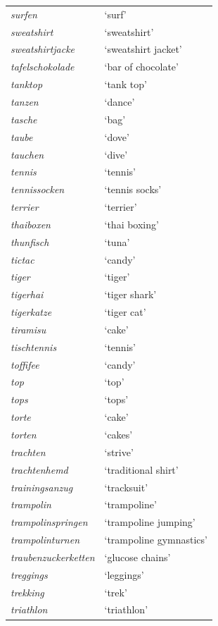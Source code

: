 \begin{longtable}{ll}
\textit{surfen} & `surf' \\
\textit{sweatshirt} & `sweatshirt' \\
\textit{sweatshirtjacke} & `sweatshirt jacket' \\
\textit{tafelschokolade} & `bar of chocolate' \\
\textit{tanktop} & `tank top' \\
\textit{tanzen} & `dance' \\
\textit{tasche} & `bag' \\
\textit{taube} & `dove' \\
\textit{tauchen} & `dive' \\
\textit{tennis} & `tennis' \\
\textit{tennissocken} & `tennis socks' \\
\textit{terrier} & `terrier' \\
\textit{thaiboxen} & `thai boxing' \\
\textit{thunfisch} & `tuna' \\
\textit{tictac} & `candy' \\
\textit{tiger} & `tiger' \\
\textit{tigerhai} & `tiger shark' \\
\textit{tigerkatze} & `tiger cat' \\
\textit{tiramisu} & `cake' \\
\textit{tischtennis} & `tennis' \\
\textit{toffifee} & `candy' \\
\textit{top} & `top' \\
\textit{tops} & `tops' \\
\textit{torte} & `cake' \\
\textit{torten} & `cakes' \\
\textit{trachten} & `strive' \\
\textit{trachtenhemd} & `traditional shirt' \\
\textit{trainingsanzug} & `tracksuit' \\
\textit{trampolin} & `trampoline' \\
\textit{trampolinspringen} & `trampoline jumping' \\
\textit{trampolinturnen} & `trampoline gymnastics' \\
\textit{traubenzuckerketten} & `glucose chains' \\
\textit{treggings} & `leggings' \\
\textit{trekking} & `trek' \\
\textit{triathlon} & `triathlon' \\

\end{longtable}
